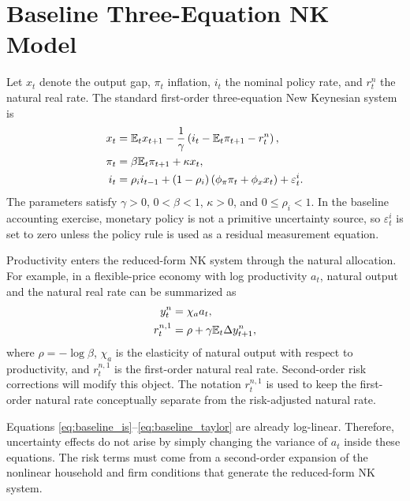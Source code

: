 \section{Baseline Three-Equation NK Model}

Let \(x_t\) denote the output gap, \(\pi_t\) inflation, \(i_t\) the nominal
policy rate, and \(r^n_t\) the natural real rate. The standard first-order
three-equation New Keynesian system is
\begin{align}
    x_t
    &=
    \mathbb{E}_t x_{t+1}
    -
    \frac{1}{\gamma}
    \left(
        i_t - \mathbb{E}_t \pi_{t+1} - r^n_t
    \right),
    \label{eq:baseline_is}
    \\
    \pi_t
    &=
    \beta \mathbb{E}_t \pi_{t+1}
    +
    \kappa x_t,
    \label{eq:baseline_nkpc}
    \\
    i_t
    &=
    \rho_i i_{t-1}
    +
    (1-\rho_i)
    \left(
        \phi_\pi \pi_t + \phi_x x_t
    \right)
    +
    \varepsilon^i_t.
    \label{eq:baseline_taylor}
\end{align}
The parameters satisfy \(\gamma>0\), \(0<\beta<1\), \(\kappa>0\), and
\(0\leq \rho_i<1\). In the baseline accounting exercise, monetary policy is not
a primitive uncertainty source, so \(\varepsilon^i_t\) is set to zero unless the
policy rule is used as a residual measurement equation.

Productivity enters the reduced-form NK system through the natural allocation.
For example, in a flexible-price economy with log productivity \(a_t\), natural
output and the natural real rate can be summarized as
\begin{align}
    y^n_t &= \chi_a a_t,
    \label{eq:natural_output}
    \\
    r^{n,1}_t
    &=
    \rho
    +
    \gamma \mathbb{E}_t \Delta y^n_{t+1},
    \label{eq:first_order_natural_rate}
\end{align}
where \(\rho=-\log\beta\), \(\chi_a\) is the elasticity of natural output with
respect to productivity, and \(r^{n,1}_t\) is the first-order natural real rate.
Second-order risk corrections will modify this object. The notation
\(r^{n,1}_t\) is used to keep the first-order natural rate conceptually separate
from the risk-adjusted natural rate.

\begin{remark}
Equations \eqref{eq:baseline_is}--\eqref{eq:baseline_taylor} are already
log-linear. Therefore, uncertainty effects do not arise by simply changing the
variance of \(a_t\) inside these equations. The risk terms must come from a
second-order expansion of the nonlinear household and firm conditions that
generate the reduced-form NK system.
\end{remark}
